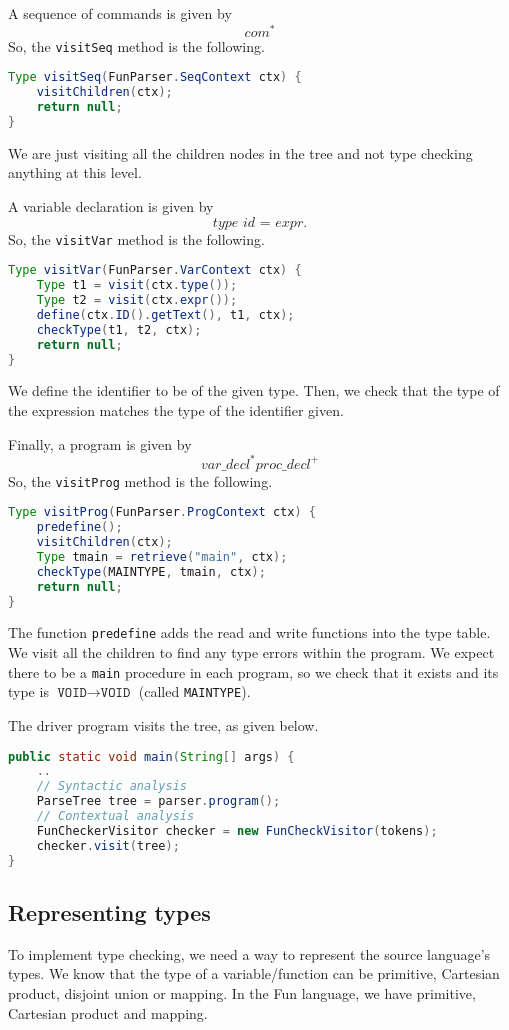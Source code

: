 \documentclass[a4paper, openany]{memoir}
\begin{document}
A sequence of commands is given by
\[\textit{com}^*\]
So, the \texttt{visitSeq} method is the following.
\begin{lstlisting}[language=java]
Type visitSeq(FunParser.SeqContext ctx) {
    visitChildren(ctx);
    return null;
}
\end{lstlisting}
We are just visiting all the children nodes in the tree and not type checking anything at this level.

A variable declaration is given by
\[\textit{type id} \texttt{ = } \textit{expr}.\]
So, the \texttt{visitVar} method is the following.
\begin{lstlisting}[language=java]
Type visitVar(FunParser.VarContext ctx) {
    Type t1 = visit(ctx.type());
    Type t2 = visit(ctx.expr());
    define(ctx.ID().getText(), t1, ctx);
    checkType(t1, t2, ctx);
    return null;
}
\end{lstlisting}
We define the identifier to be of the given type. Then, we check that the type of the expression matches the type of the identifier given.

Finally, a program is given by
\[\textit{var\_decl}^* \textit{proc\_decl}^+ \]
So, the \texttt{visitProg} method is the following.
\begin{lstlisting}[language=java]
Type visitProg(FunParser.ProgContext ctx) {
    predefine();
    visitChildren(ctx);
    Type tmain = retrieve("main", ctx);
    checkType(MAINTYPE, tmain, ctx);
    return null;
}
\end{lstlisting}
The function \texttt{predefine} adds the read and write functions into the type table. We visit all the children to find any type errors within the program. We expect there to be a \texttt{main} procedure in each program, so we check that it exists and its type is $\texttt{VOID} \to \texttt{VOID}$ (called \texttt{MAINTYPE}).

The driver program visits the tree, as given below.
\begin{lstlisting}[language=java]
public static void main(String[] args) {
    ..
    // Syntactic analysis 
    ParseTree tree = parser.program();
    // Contextual analysis
    FunCheckerVisitor checker = new FunCheckVisitor(tokens);
    checker.visit(tree);
}
\end{lstlisting}

\subsection{Representing types}
To implement type checking, we need a way to represent the source language's types. We know that the type of a variable/function can be primitive, Cartesian product, disjoint union or mapping. In the Fun language, we have primitive, Cartesian product and mapping.
\end{document}
